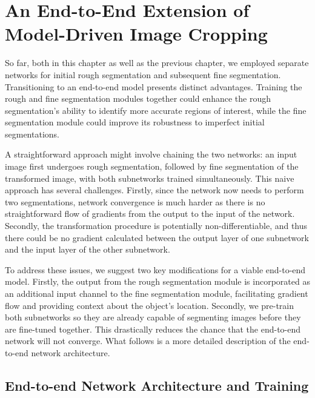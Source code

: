 \section{An End-to-End Extension of Model-Driven Image Cropping}

So far, both in this chapter as well as the previous chapter, we employed separate networks for initial rough segmentation and subsequent fine segmentation. Transitioning to an end-to-end model presents distinct advantages. Training the rough and fine segmentation modules together could enhance the rough segmentation's ability to identify more accurate regions of interest, while the fine segmentation module could improve its robustness to imperfect initial segmentations.

A straightforward approach might involve chaining the two networks: an input image first undergoes rough segmentation, followed by fine segmentation of the transformed image, with both subnetworks trained simultaneously. This naive approach has several challenges. Firstly, since the network now needs to perform two segmentations, network convergence is much harder as there is no straightforward flow of gradients from the output to the input of the network. Secondly, the transformation procedure is potentially non-differentiable, and thus there could be no gradient calculated between the output layer of one subnetwork and the input layer of the other subnetwork.

To address these issues, we suggest two key modifications for a viable end-to-end model. Firstly, the output from the rough segmentation module is incorporated as an additional input channel to the fine segmentation module, facilitating gradient flow and providing context about the object's location. Secondly, we pre-train both subnetworks so they are already capable of segmenting images before they are fine-tuned together. This drastically reduces the chance that the end-to-end network will not converge. What follows is a more detailed description of the end-to-end network architecture.

\subsection{End-to-end Network Architecture and Training}

